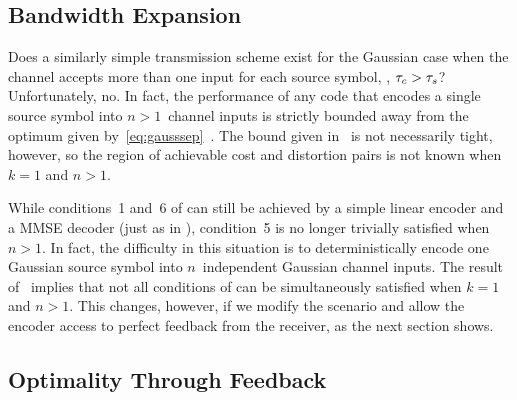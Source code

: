 \subsection{Bandwidth Expansion}\label{sec:gaussbwex}

Does a similarly simple transmission scheme exist for the Gaussian case when the
channel accepts more than one input for each source symbol, \ie, ${\tau_c} > {\tau_s}$?
Unfortunately, no. In fact, the performance of any code that encodes a single
source symbol into $n>1$~channel inputs is strictly bounded away from the
optimum given by~\eqref{eq:gausssep}~\cite{IngberLZF2008}.  The bound given
in~\cite{IngberLZF2008} is not necessarily tight, however, so the region of
achievable cost and distortion pairs is not known when $k = 1$ and $n > 1$. 

While conditions~1 and~6 of  can still be achieved
by a simple linear encoder and a MMSE decoder (just as in ),
condition~5 is no longer trivially satisfied when $n > 1$. In fact, the
difficulty in this situation is to deterministically encode one Gaussian source
symbol into $n$~independent Gaussian channel inputs. The result
of~\cite{IngberLZF2008} implies that not all conditions of
 can be simultaneously satisfied when $k = 1$ and
$n > 1$.  This changes, however, if we modify the scenario and allow the encoder
access to perfect feedback from the receiver, as the next section shows.

%


\subsection{Optimality Through Feedback}\label{sec:gaussfeedback}

